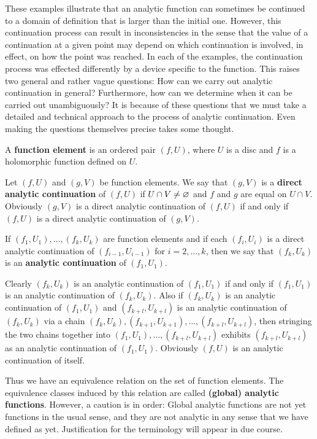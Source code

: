 These examples illustrate that an analytic function can sometimes be
continued to a domain of definition that is larger than the initial one. However, this continuation process can result in inconsistencies in the sense that the value of a continuation at a given point may depend on which continuation is involved, in effect, on how the point was reached. In each of the examples, the continuation process was effected differently by a device specific to the function. This raises two general and rather vague questions: How can we carry out analytic continuation in general? Furthermore, how can we determine when it can be carried out unambiguously? It is because of these questions that we must take a detailed and technical approach to the process of analytic continuation. Even making the questions themselves precise takes some thought.
\begin{definition}
A \textbf{function element} is an ordered pair $(f,U)$, where $U$ is a disc and $f$ is a holomorphic function defined on $U$.
\end{definition}
\begin{definition}
Let $(f,U)$ and $(g,V)$ be function elements. We say that $(g,V)$ is a \textbf{direct analytic continuation} of $(f,U)$ if $U\cap V\neq\varnothing$ and $f$ and $g$ are equal on $U\cap V$. Obviously $(g,V)$ is a direct analytic continuation of $(f,U)$ if and only if $(f,U)$ is a direct analytic continuation of $(g,V)$.
\end{definition}
If $(f_1,U_1),\dots,(f_k,U_k)$ are function elements and if each $(f_i,U_i)$ is a direct analytic continuation of $(f_{i-1},U_{i-1})$ for $i=2,\dots,k$, then we say that $(f_k,U_k)$ is an \textbf{analytic continuation} of $(f_1,U_1)$.\par
Clearly $(f_k,U_k)$ is an analytic continuation of $(f_1,U_1)$ if and only if $(f_1,U_1)$ is an analytic continuation of $(f_k,U_k)$. Also if $(f_k,U_k)$ is an analytic continuation of $(f_1,U_1)$ and $(f_{k+l},U_{k+l})$ is an analytic continuation of $(f_k,U_k)$ via a chain $(f_k,U_k),(f_{k+1},U_{k+1}),\dots,(f_{k+l},U_{k+l})$, then stringing the two chains together into $(f_1,U_1),\dots,(f_{k+l},U_{k+l})$ exhibits $(f_{k+l},U_{k+l})$ as an analytic continuation of $(f_1,U_1)$. Obviously $(f,U)$ is an analytic continuation of itself.\par
Thus we have an equivalence relation on the set of function elements.
The equivalence classes induced by this relation are called \textbf{(global) analytic functions}. However, a caution is in order: Global analytic functions are not yet functions in the usual sense, and they are not analytic in any sense that we have defined as yet. Justification for the terminology will appear in due course.\par
